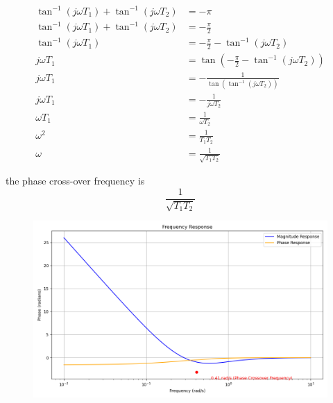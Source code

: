 \documentclass[journal,12pt,twocolumn]{IEEEtran}
\begin{document}
\begin{align}
\tan^{-1}(j\omega T_1) + \tan^{-1}(j\omega T_2) &= -\pi \\
\tan^{-1}(j\omega T_1) + \tan^{-1}(j\omega T_2) &= -\frac{\pi}{2} \\
\tan^{-1}(j\omega T_1) &= -\frac{\pi}{2} - \tan^{-1}(j\omega T_2) \\
j\omega T_1 &= \tan\left(-\frac{\pi}{2} - \tan^{-1}(j\omega T_2)\right) \\
j\omega T_1 &= -\frac{1}{\tan(\tan^{-1}(j\omega T_2))} \\
j\omega T_1 &= -\frac{1}{j\omega T_2} \\
\omega T_1 &= \frac{1}{\omega T_2} \\
\omega^2 &= \frac{1}{T_1 T_2} \\
\omega &= \frac{1}{\sqrt{T_1 T_2}}
\end{align}

the phase cross-over frequency is \[ {\frac{1}{\sqrt{T_1 T_2}}} \]
\begin{figure}[!ht] 
\centering
\includegraphics[width=2\columnwidth]{2023/EC/25/figs/graph.png}
\label{fig:Graph1}
\end{figure}
\end{document}
